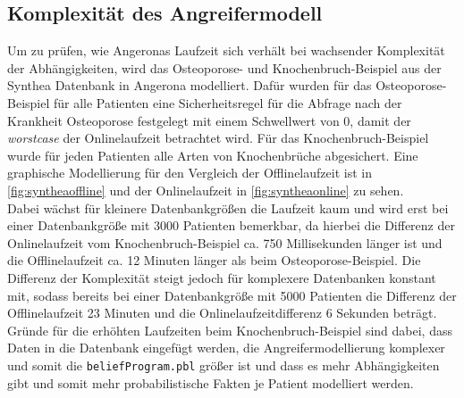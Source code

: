\documentclass[german,version-2020-11]{uzl-thesis}
\begin{document}
\subsection{Komplexität des Angreifermodell}
Um zu prüfen, wie Angeronas Laufzeit sich verhält bei wachsender Komplexität der Abhängigkeiten, wird das Osteoporose- und Knochenbruch-Beispiel aus der Synthea Datenbank in Angerona modelliert. Dafür wurden für das Osteoporose-Beispiel für alle Patienten eine Sicherheitsregel für die Abfrage nach der Krankheit Osteoporose festgelegt mit einem Schwellwert von 0, damit der \emph{worstcase} der Onlinelaufzeit betrachtet wird. Für das Knochenbruch-Beispiel wurde für jeden Patienten alle Arten von Knochenbrüche abgesichert. Eine graphische Modellierung für den Vergleich der Offlinelaufzeit ist in \autoref{fig:syntheaoffline} und der Onlinelaufzeit in \autoref{fig:syntheaonline} zu sehen.\\  Dabei wächst für kleinere Datenbankgrößen die Laufzeit kaum und wird erst bei einer Datenbankgröße mit 3000 Patienten bemerkbar, da hierbei die Differenz der Onlinelaufzeit vom Knochenbruch-Beispiel ca. 750 Millisekunden länger ist und die Offlinelaufzeit ca. 12 Minuten länger als beim Osteoporose-Beispiel. Die Differenz der Komplexität steigt jedoch für komplexere Datenbanken konstant mit, sodass bereits bei einer Datenbankgröße mit 5000 Patienten die Differenz der Offlinelaufzeit 23 Minuten und die Onlinelaufzeitdifferenz 6 Sekunden beträgt.
Gründe für die erhöhten Laufzeiten beim Knochenbruch-Beispiel sind dabei, dass Daten in die Datenbank eingefügt werden, die Angreifermodellierung komplexer und somit die \texttt{beliefProgram.pbl} größer ist und dass es mehr Abhängigkeiten gibt und somit mehr probabilistische Fakten je Patient modelliert werden.  
\end{document}
